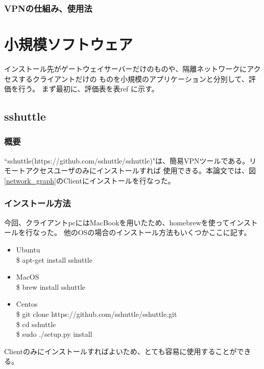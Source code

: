 \documentclass[12pt,a4paper,titlepage]{jsarticle}
\begin{document}

\subsubsection{VPNの仕組み、使用法}

\section{小規模ソフトウェア}
インストール先がゲートウェイサーバーだけのものや、隔離ネットワークにアクセスするクライアントだけの
ものを小規模のアプリケーションと分別して、評価を行う。
まず最初に、評価表を表ref に示す。


\subsection{sshuttle}
\subsubsection*{概要}
``sshuttle(https://github.com/sshuttle/sshuttle)"は、簡易VPNツールである。リモートアクセスユーザのみにインストールすれば
    使用できる。本論文では、図\ref{network_graph}のClientにインストールを行なった。
\subsubsection*{インストール方法}
今回、クライアントpcにはMacBookを用いたため、homebrewを使ってインストールを行なった。
他のOSの場合のインストール方法もいくつかここに記す。
\begin{itemize}
    \item Ubuntu \mbox{}\\ \$ apt-get install sshuttle
    \item MacOS \mbox{}\\ \$ brew install sshuttle
    \item Centos \mbox{}\\  \$ git clone https://github.com/sshuttle/sshuttle.git\\\$ cd sshuttle \\ \$ sudo ./setup.py install 
\end{itemize}
Clientのみにインストールすればよいため、とても容易に使用することができる。
\end{document}
